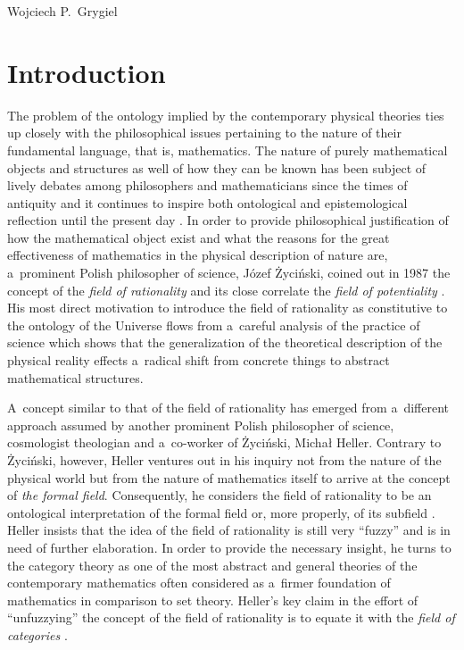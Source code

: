 \begin{artengenv}{Wojciech P.~Grygiel}
\section{Introduction}
\lettrine[loversize=0.13,lines=2,lraise=-0.01,nindent=0em,findent=0.2pt]%
{T}{}he problem of the ontology implied by the contemporary physical theories ties up closely with the philosophical issues pertaining to the nature of their fundamental language, that is, mathematics. The nature of purely mathematical objects and structures as well of how they can be known has been subject of lively debates among philosophers and mathematicians since the times of antiquity and it continues to inspire both ontological and epistemological reflection until the present day
\parencite[e.g.][]{shapiro_thinking_2000}. %
 In order to provide philosophical justification of how the mathematical object exist and what the reasons for the great effectiveness of mathematics in the physical description of nature are, a~prominent Polish philosopher of science, Józef Życiński, coined out in 1987 the concept of the \textit{field of rationality} and its close correlate the \textit{field of potentiality} 
\parencites[][]{zycinski_filozoficzne_1987}[][]{zycinski_teizm_1988}. %
 His most direct motivation to introduce the field of rationality as constitutive to the ontology of the Universe flows from a~careful analysis of the practice of science which shows that the generalization of the theoretical description of the physical reality effects a~radical shift from concrete things to abstract mathematical structures.

A~concept similar to that of the field of rationality has emerged from a~different approach assumed by another prominent Polish philosopher of science, cosmologist theologian and a~co-worker of Życiński, Michał Heller. Contrary to Życiński, however, Heller ventures out in his inquiry not from the nature of the physical world but from the nature of mathematics itself to arrive at the concept of \textit{the formal field}. Consequently, he considers the field of rationality to be an ontological interpretation of the formal field or, more properly, of its subfield
\parencite[][p.442]{heller_field_2014}. %
 Heller insists that the idea of the field of rationality is still very ``fuzzy'' and is in need of further elaboration. In order to provide the necessary insight, he turns to the category theory as one of the most abstract and general theories of the contemporary mathematics often considered as a~firmer foundation of mathematics in comparison to set theory. Heller's key claim in the effort of ``unfuzzying'' the concept of the field of rationality is to equate it with the \textit{field of categories} 
\parencite[][p.453]{heller_field_2014}.%



\end{artengenv}
